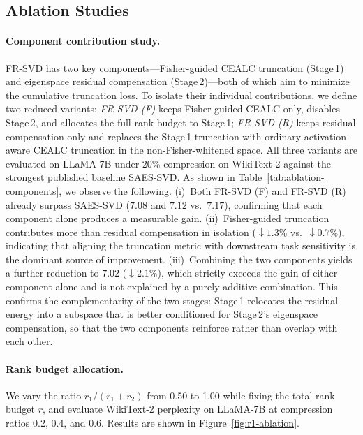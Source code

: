 \documentclass[a4paper,fleqn]{cas-dc}
\begin{document}


\subsection{Ablation Studies}

\paragraph{Component contribution study.}
FR-SVD has two key components---Fisher-guided CEALC truncation (Stage\,1) and
eigenspace residual compensation (Stage\,2)---both of which aim to minimize
the cumulative truncation loss. To isolate their individual contributions, we
define two reduced variants: \emph{FR-SVD (F)} keeps Fisher-guided CEALC only,
disables Stage\,2, and allocates the full rank budget to Stage\,1;
\emph{FR-SVD (R)} keeps residual compensation only and replaces the Stage\,1
truncation with ordinary activation-aware CEALC truncation in the
non-Fisher-whitened space. All three variants are evaluated on LLaMA-7B under
20\% compression on WikiText-2 against the strongest published baseline
SAES-SVD. As shown in Table~\ref{tab:ablation-components}, we observe the
following. (i)~Both FR-SVD (F) and FR-SVD (R) already surpass SAES-SVD
($7.08$ and $7.12$ vs.\ $7.17$), confirming that each component alone
produces a measurable gain. (ii)~Fisher-guided truncation contributes more
than residual compensation in isolation ($\downarrow 1.3\%$ vs.\
$\downarrow 0.7\%$), indicating that aligning the truncation metric with
downstream task sensitivity is the dominant source of improvement.
(iii)~Combining the two components yields a further reduction to $7.02$
($\downarrow 2.1\%$), which strictly exceeds the gain of either component
alone and is not explained by a purely additive combination. This confirms
the complementarity of the two stages: Stage\,1 relocates the residual
energy into a subspace that is better conditioned for Stage\,2's eigenspace
compensation, so that the two components reinforce rather than overlap with
each other.



\paragraph{Rank budget allocation.}
We vary the ratio $r_1/(r_1{+}r_2)$ from 0.50 to 1.00 while fixing the total rank budget
$r$, and evaluate WikiText-2 perplexity on LLaMA-7B at compression ratios 0.2, 0.4, and
0.6. Results are shown in Figure~\ref{fig:r1-ablation}.
\end{document}
